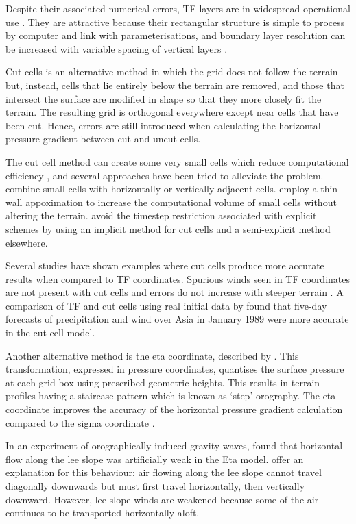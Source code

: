 \documentclass[draft]{ametsoc}
\begin{document}
Despite their associated numerical errors, TF layers are in widespread operational use \citep{steppeler2003}.  They are attractive because their rectangular structure is simple to process by computer and link with parameterisations, and boundary layer resolution can be increased with variable spacing of vertical layers \citep{schaer2002}.

Cut cells is an alternative method in which the grid does not follow the terrain but, instead, cells that lie entirely below the terrain are removed, and those that intersect the surface are modified in shape so that they more closely fit the terrain.  The resulting grid is orthogonal everywhere except near cells that have been cut.  Hence, errors are still introduced when calculating the horizontal pressure gradient between cut and uncut cells.

The cut cell method can create some very small cells which reduce computational efficiency \citep{klein2009}, and several approaches have been tried to alleviate the problem.  \citet{yamazaki-satomura2010} combine small cells with horizontally or vertically adjacent cells.  \citet{steppeler2002} employ a thin-wall appoximation to increase the computational volume of small cells without altering the terrain.  \citet{jebens2011} avoid the timestep restriction associated with explicit schemes by using an implicit method for cut cells and a semi-explicit method elsewhere.

Several studies have shown examples where cut cells produce more accurate results when compared to TF coordinates.  Spurious winds seen in TF coordinates are not present with cut cells and errors do not increase with steeper terrain \citep{good2014}.  A comparison of TF and cut cells using real initial data by \citet{steppeler2013} found that five-day forecasts of precipitation and wind over Asia in January 1989 were more accurate in the cut cell model.

Another alternative method is the eta coordinate, described by \citet{mesinger1988}.  This transformation, expressed in pressure coordinates, quantises the surface pressure at each grid box using prescribed geometric heights.  This results in terrain profiles having a staircase pattern which is known as `step' orography.  The eta coordinate improves the accuracy of the horizontal pressure gradient calculation compared to the sigma coordinate \citep{mesinger1988}.

In an experiment of orographically induced gravity waves, \citet{gallus-klemp2000} found that horizontal flow along the lee slope was artificially weak in the Eta model.  \citet{mesinger2012} offer an explanation for this behaviour: air flowing along the lee slope cannot travel diagonally downwards but must first travel horizontally, then vertically downward.  However, lee slope winds are weakened because some of the air continues to be transported horizontally aloft.
\end{document}
